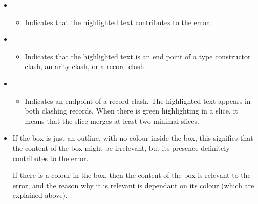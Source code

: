 \documentclass{article}
\begin{document}
\begin{itemize}

\item {}

\begin{itemize}
\item Indicates that the highlighted text contributes to the error.
\end{itemize}

\item {}


\begin{itemize}
\item Indicates that the highlighted text is an end point of a
  type constructor clash, an arity clash, or a record clash.


\end{itemize}

\item {}


\begin{itemize}
\item Indicates an endpoint of a record clash. The highlighted text
  appears in both clashing records. When there is green
  highlighting in a slice, it means that the slice merges at least two
  minimal slices.
\end{itemize}


\item {}

\subitem If the box is just an outline, with no colour inside the box,
  this signifies that the content of the box might be irrelevant, but its
  presence definitely contributes to the error.

\subitem If there is a colour in the box, then the
  content of the box is relevant to the error, and the reason why it
  is relevant is dependant on its colour (which are explained above).


\end{itemize}
\end{document}
